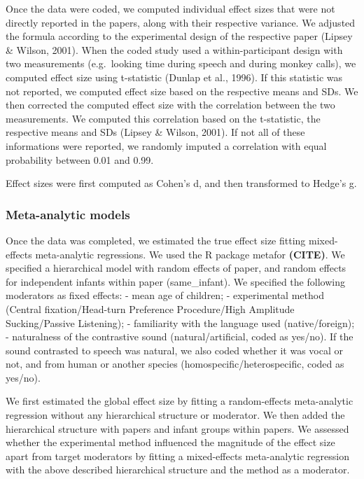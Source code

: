 \documentclass[man]{apa6}
\begin{document}
Once the data were coded, we computed individual effect sizes that were
not directly reported in the papers, along with their respective
variance. We adjusted the formula according to the experimental design
of the respective paper (Lipsey \& Wilson, 2001). When the coded study
used a within-participant design with two measurements (e.g.~looking
time during speech and during monkey calls), we computed effect size
using t-statistic (Dunlap et al., 1996). If this statistic was not
reported, we computed effect size based on the respective means and SDs.
We then corrected the computed effect size with the correlation between
the two measurements. We computed this correlation based on the
t-statistic, the respective means and SDs (Lipsey \& Wilson, 2001). If
not all of these informations were reported, we randomly imputed a
correlation with equal probability between 0.01 and 0.99.

Effect sizes were first computed as Cohen's d, and then transformed to
Hedge's g.

\subsubsection{Meta-analytic models}\label{meta-analytic-models}

Once the data was completed, we estimated the true effect size fitting
mixed-effects meta-analytic regressions. We used the R package metafor
\textbf{(CITE)}. We specified a hierarchical model with random effects
of paper, and random effects for independent infants within paper
(same\_infant). We specified the following moderators as fixed effects:
- mean age of children; - experimental method (Central
fixation/Head-turn Preference Procedure/High Amplitude Sucking/Passive
Listening); - familiarity with the language used (native/foreign); -
naturalness of the contrastive sound (natural/artificial, coded as
yes/no). If the sound contrasted to speech was natural, we also coded
whether it was vocal or not, and from human or another species
(homospecific/heterospecific, coded as yes/no).

We first estimated the global effect size by fitting a random-effects
meta-analytic regression without any hierarchical structure or
moderator. We then added the hierarchical structure with papers and
infant groups within papers. We assessed whether the experimental method
influenced the magnitude of the effect size apart from target moderators
by fitting a mixed-effects meta-analytic regression with the above
described hierarchical structure and the method as a moderator.
\end{document}
